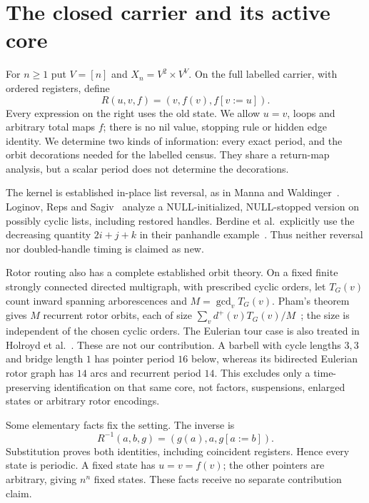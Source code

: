 \section{The closed carrier and its active core}
For $n\ge1$ put $V=[n]$ and $X_n=V^2\times V^V$. On the full labelled
carrier, with ordered registers, define
\begin{equation}\label{eq:update}
 R(u,v,f)=(v,f(v),f[v:=u]).
\end{equation}
Every expression on the right uses the old state. We allow $u=v$, loops and
arbitrary total maps $f$; there is no nil value, stopping rule or hidden edge
identity. We determine two kinds of information: every exact period, and
the orbit decorations needed for the labelled census. They share a return-map
analysis, but a scalar period does not determine the decorations.

The kernel is established in-place list reversal, as in Manna and
Waldinger~\cite{manna1987}. Loginov, Reps and Sagiv~\cite{loginov2007}
analyze a NULL-initialized, NULL-stopped version on possibly cyclic lists,
including restored handles. Berdine et al.\ explicitly use the decreasing
quantity $2i+j+k$ in their panhandle example~\cite[Example~8]{berdine2006}.
Thus neither reversal nor doubled-handle timing is claimed as new.

Rotor routing also has a complete established orbit theory. On a fixed finite
strongly connected directed multigraph, with prescribed cyclic orders, let
$T_G(v)$ count inward spanning arborescences and $M=\gcd_v T_G(v)$.
Pham's theorem gives $M$ recurrent rotor orbits, each of size
$\sum_v d^+(v)T_G(v)/M$~\cite[Theorem~1]{pham2015}; the size is independent
of the chosen cyclic orders. The Eulerian tour case is also treated in
Holroyd et al.\ \cite[Lemma~4.9]{holroyd2008}.
These are not our contribution. A barbell with cycle lengths $3,3$ and bridge
length $1$ has pointer period $16$ below, whereas its bidirected Eulerian
rotor graph has $14$ arcs and recurrent period $14$. This excludes only a
time-preserving identification on that same core, not factors, suspensions,
enlarged states or arbitrary rotor encodings.

Some elementary facts fix the setting. The inverse is
\begin{equation}\label{eq:inverse}
 R^{-1}(a,b,g)=(g(a),a,g[a:=b]).
\end{equation}
Substitution proves both identities, including coincident registers. Hence
every state is periodic. A fixed state has $u=v=f(v)$; the other pointers
are arbitrary, giving $n^n$ fixed states. These facts receive no separate
contribution claim.

